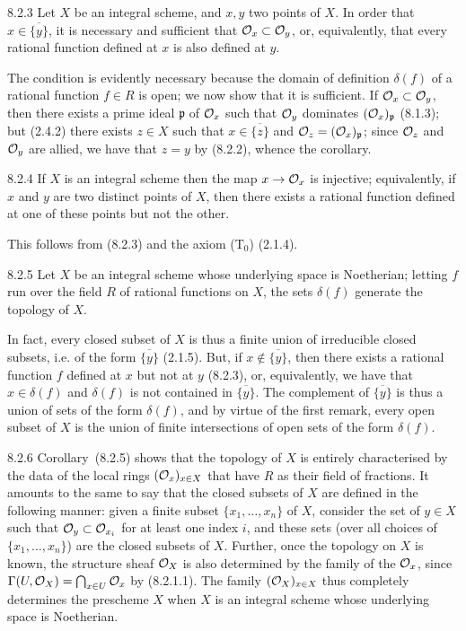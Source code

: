 \documentclass[../main.tex]{subfiles}
\begin{document}
\begin{cx}[Corollary]{8.2.3}
    Let $X$ be an integral scheme, and $x,y$ two points of $X$.
    In order that $x\in\overline{\{y\}}$, it is necessary and sufficient that $\mathcal{O}_x\subset\mathcal{O}_y$, or, equivalently, that every rational function defined at $x$ is also defined at $y$.
\end{cx}    

The condition is evidently necessary because the domain of definition $\delta(f)$ of a rational function $f\in R$ is open; we now show that it is sufficient.
If $\mathcal{O}_x\subset\mathcal{O}_y$, then there exists a prime ideal $\mathfrak{p}$ of $\mathcal{O}_x$ such that $\mathcal{O}_y$ dominates $(\mathcal{O}_x)_\mathfrak{p}$ (8.1.3); but (2.4.2) there exists $z\in X$ such that $x\in\overline{\{z\}}$ and $\mathcal{O}_z=(\mathcal{O}_x)_\mathfrak{p}$; since $\mathcal{O}_z$ and $\mathcal{O}_y$ are allied, we have that $z=y$ by (8.2.2), whence the corollary.

\begin{cx}[Corollary]{8.2.4}
    If $X$ is an integral scheme then the map $x\to\mathcal{O}_x$ is injective; equivalently, if $x$ and $y$ are two distinct points of $X$, then there exists a rational function defined at one of these points but not the other.
\end{cx}

This follows from (8.2.3) and the axiom ($\mathrm{T}_0$) (2.1.4).

\begin{cx}[Corollary]{8.2.5}
    Let $X$ be an integral scheme whose underlying space is Noetherian; letting $f$ run over the field $R$ of rational functions on $X$, the sets $\delta(f)$ generate the topology of $X$.
\end{cx}

In fact, every closed subset of $X$ is thus a finite union of irreducible closed subsets, i.e. of the form $\overline{\{y\}}$ (2.1.5).
But, if $x\not\in\overline{\{y\}}$, then there exists a rational function $f$ defined at $x$ but not at $y$ (8.2.3), or, equivalently, we have that $x\in\delta(f)$ and $\delta(f)$ is not contained in $\overline{\{y\}}$.
The complement  of $\overline{\{y\}}$ is thus a union of sets of the form $\delta(f)$, and by virtue of the first remark, every open subset of $X$ is the union of finite intersections of open sets of the form $\delta(f)$.

\begin{cx}{8.2.6}
    Corollary~(8.2.5) shows that the topology of $X$ is entirely characterised by the data of the local rings $(\mathcal{O}_x)_{x\in X}$ that have $R$ as their field of fractions.
    It amounts to the same to say that the closed subsets of $X$ are defined in the following manner: given a finite subset $\{x_1,\ldots,x_n\}$ of $X$, consider the set of $y\in X$ such that $\mathcal{O}_y\subset\mathcal{O}_{x_i}$ for at least one index $i$, and these sets (over all choices of $\{x_1,\ldots,x_n\}$) are the closed subsets of $X$.
    Further, once the topology on $X$ is known, the structure sheaf $\mathcal{O}_X$ is also determined by the family of the $\mathcal{O}_x$, since $\Gamma(U,\mathcal{O}_X)=\bigcap_{x\in U}\mathcal{O}_x$ by (8.2.1.1).
    The family $(\mathcal{O}_X)_{x\in X}$ thus completely determines the prescheme $X$ when $X$ is an integral scheme whose underlying space is Noetherian.
\end{cx}
\end{document}
